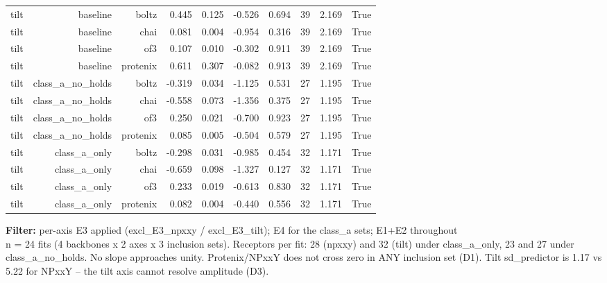 \begin{longtable}{lrrrrrrrrr}
tilt & baseline & boltz & 0.445 & 0.125 & -0.526 & 0.694 & 39 & 2.169 & True \\
tilt & baseline & chai & 0.081 & 0.004 & -0.954 & 0.316 & 39 & 2.169 & True \\
tilt & baseline & of3 & 0.107 & 0.010 & -0.302 & 0.911 & 39 & 2.169 & True \\
tilt & baseline & protenix & 0.611 & 0.307 & -0.082 & 0.913 & 39 & 2.169 & True \\
tilt & class\_a\_no\_holds & boltz & -0.319 & 0.034 & -1.125 & 0.531 & 27 & 1.195 & True \\
tilt & class\_a\_no\_holds & chai & -0.558 & 0.073 & -1.356 & 0.375 & 27 & 1.195 & True \\
tilt & class\_a\_no\_holds & of3 & 0.250 & 0.021 & -0.700 & 0.923 & 27 & 1.195 & True \\
tilt & class\_a\_no\_holds & protenix & 0.085 & 0.005 & -0.504 & 0.579 & 27 & 1.195 & True \\
tilt & class\_a\_only & boltz & -0.298 & 0.031 & -0.985 & 0.454 & 32 & 1.171 & True \\
tilt & class\_a\_only & chai & -0.659 & 0.098 & -1.327 & 0.127 & 32 & 1.171 & True \\
tilt & class\_a\_only & of3 & 0.233 & 0.019 & -0.613 & 0.830 & 32 & 1.171 & True \\
tilt & class\_a\_only & protenix & 0.082 & 0.004 & -0.440 & 0.556 & 32 & 1.171 & True \\
\end{longtable}
\begin{flushleft}\scriptsize
\textbf{Filter:} per-axis E3 applied (excl\_E3\_npxxy / excl\_E3\_tilt); E4 for the class\_a sets; E1+E2 throughout
 \\ n = 24 fits (4 backbones x 2 axes x 3 inclusion sets). Receptors per fit: 28 (npxxy) and 32 (tilt) under class\_a\_only, 23 and 27 under class\_a\_no\_holds. No slope approaches unity. Protenix/NPxxY does not cross zero in ANY inclusion set (D1). Tilt sd\_predictor is 1.17 vs 5.22 for NPxxY -- the tilt axis cannot resolve amplitude (D3).
\end{flushleft}
\endgroup
